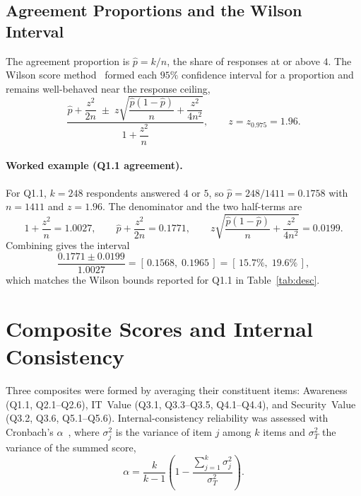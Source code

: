 \subsection{Agreement Proportions and the Wilson Interval}

The agreement proportion is $\hat{p}=k/n$, the share of responses at or above $4$. The Wilson score method~\parencite{Wilson_1927} formed each $95\%$ confidence interval for a proportion and remains well-behaved near the response ceiling,
\begin{equation}
  \frac{\hat{p}+\dfrac{z^2}{2n}\;\pm\; z\sqrt{\dfrac{\hat{p}\left(1-\hat{p}\right)}{n}+\dfrac{z^2}{4n^2}}}{1+\dfrac{z^2}{n}},
  \qquad z=z_{0.975}=1.96 .
\end{equation}

\paragraph{Worked example (Q1.1 agreement).} For Q1.1, $k=248$ respondents answered $4$ or $5$, so $\hat{p}=248/1411=0.1758$ with $n=1411$ and $z=1.96$. The denominator and the two half-terms are
\begin{equation}
  1+\frac{z^2}{n}=1.0027,\qquad
  \hat{p}+\frac{z^2}{2n}=0.1771,\qquad
  z\sqrt{\frac{\hat{p}(1-\hat{p})}{n}+\frac{z^2}{4n^2}}=0.0199 .
\end{equation}
Combining gives the interval
\begin{equation}
  \frac{0.1771 \pm 0.0199}{1.0027} = [\,0.1568,\; 0.1965\,] = [\,15.7\%,\; 19.6\%\,],
\end{equation}
which matches the Wilson bounds reported for Q1.1 in Table~\ref{tab:desc}.

\section{Composite Scores and Internal Consistency}

Three composites were formed by averaging their constituent items: Awareness (Q1.1, Q2.1--Q2.6), IT~Value (Q3.1, Q3.3--Q3.5, Q4.1--Q4.4), and Security~Value (Q3.2, Q3.6, Q5.1--Q5.6). Internal-consistency reliability was assessed with Cronbach's $\alpha$~\parencite{Cronbach_1951}, where $\sigma^2_{j}$ is the variance of item $j$ among $k$ items and $\sigma^2_{T}$ the variance of the summed score,
\begin{equation}
  \alpha = \frac{k}{k-1}\left(1-\frac{\sum_{j=1}^{k}\sigma^2_{j}}{\sigma^2_{T}}\right).
\end{equation}

